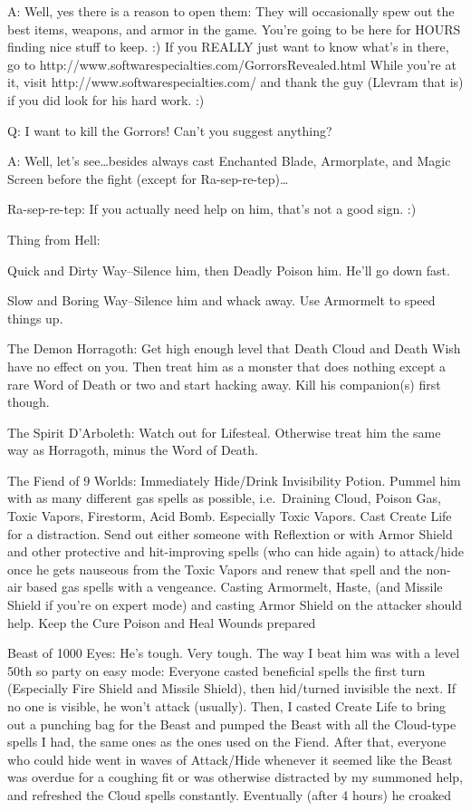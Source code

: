 \documentclass[12pt]{article}
\begin{document}
A: Well, yes there is a reason to open them: They will occasionally spew
out the best items, weapons, and armor in the game. You're going to be
here for HOURS finding nice stuff to keep. :) If you REALLY just want to
know what's in there, go to
http://www.softwarespecialties.com/GorrorsRevealed.html While you're at
it, visit http://www.softwarespecialties.com/ and thank the guy (Llevram
that is) if you did look for his hard work. :)

Q: I want to kill the Gorrors! Can't you suggest anything?

A: Well, let's see\ldots{}besides always cast Enchanted Blade,
Armorplate, and Magic Screen before the fight (except for
Ra-sep-re-tep)\ldots{}

Ra-sep-re-tep: If you actually need help on him, that's not a good sign.
:)

Thing from Hell:

Quick and Dirty Way--Silence him, then Deadly Poison him. He'll go down
fast.

Slow and Boring Way--Silence him and whack away. Use Armormelt to speed
things up.

The Demon Horragoth: Get high enough level that Death Cloud and Death
Wish have no effect on you. Then treat him as a monster that does
nothing except a rare Word of Death or two and start hacking away. Kill
his companion(s) first though.

The Spirit D'Arboleth: Watch out for Lifesteal. Otherwise treat him the
same way as Horragoth, minus the Word of Death.

The Fiend of 9 Worlds: Immediately Hide/Drink Invisibility Potion.
Pummel him with as many different gas spells as possible, i.e.~Draining
Cloud, Poison Gas, Toxic Vapors, Firestorm, Acid Bomb. Especially Toxic
Vapors. Cast Create Life for a distraction. Send out either someone with
Reflextion or with Armor Shield and other protective and hit-improving
spells (who can hide again) to attack/hide once he gets nauseous from
the Toxic Vapors and renew that spell and the non-air based gas spells
with a vengeance. Casting Armormelt, Haste, (and Missile Shield if
you're on expert mode) and casting Armor Shield on the attacker should
help. Keep the Cure Poison and Heal Wounds prepared

Beast of 1000 Eyes: He's tough. Very tough. The way I beat him was with
a level 50th so party on easy mode: Everyone casted beneficial spells
the first turn (Especially Fire Shield and Missile Shield), then
hid/turned invisible the next. If no one is visible, he won't attack
(usually). Then, I casted Create Life to bring out a punching bag for
the Beast and pumped the Beast with all the Cloud-type spells I had, the
same ones as the ones used on the Fiend. After that, everyone who could
hide went in waves of Attack/Hide whenever it seemed like the Beast was
overdue for a coughing fit or was otherwise distracted by my summoned
help, and refreshed the Cloud spells constantly. Eventually (after 4
hours) he croaked
\end{document}
